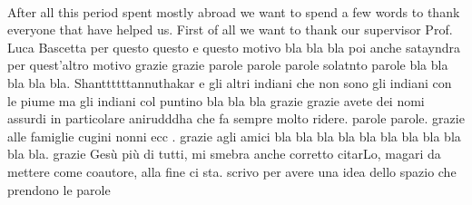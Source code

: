 \\After all this period spent mostly abroad we want to spend a few words to thank everyone that have helped us. First of all we want to thank our supervisor Prof. Luca Bascetta per questo questo e questo motivo bla bla bla poi anche satayndra per quest'altro motivo grazie grazie parole parole parole solatnto parole bla bla bla bla bla. Shanttttttannuthakar e gli altri indiani che non sono gli indiani con le piume ma gli indiani col puntino bla bla bla grazie grazie avete dei nomi assurdi in particolare anirudddha che fa sempre molto ridere. parole parole. grazie alle famiglie cugini nonni ecc . grazie agli amici bla bla bla bla bla bla bla bla bla bla bla. grazie Gesù più di tutti, mi smebra anche corretto citarLo, magari da mettere come coautore, alla fine ci sta. scrivo per avere una idea dello spazio che prendono le parole






